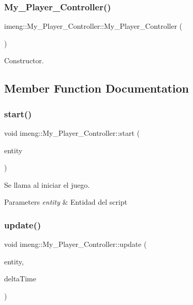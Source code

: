 \subsubsection{My\_Player\_Controller()}
{\footnotesize\ttfamily imeng\+::\+My\+\_\+\+Player\+\_\+\+Controller\+::\+My\+\_\+\+Player\+\_\+\+Controller (\begin{DoxyParamCaption}{ }\end{DoxyParamCaption})}



Constructor. 



\subsection{Member Function Documentation}
\mbox{\label{classimeng_1_1_my___player___controller_a0e5ab00dc99d921e5464e4a69be9be8c}} 
\subsubsection{start()}
{\footnotesize\ttfamily void imeng\+::\+My\+\_\+\+Player\+\_\+\+Controller\+::start (\begin{DoxyParamCaption}\item[{Entity $\ast$}]{entity }\end{DoxyParamCaption})\hspace{0.3cm}{\ttfamily [override]}}



Se llama al iniciar el juego. 


\begin{DoxyParams}{Parameters}
{\em entity} & Entidad del script \\
\hline
\end{DoxyParams}
\mbox{\label{classimeng_1_1_my___player___controller_a04ed366cb26b07aee77c0ec467eba849}} 
\subsubsection{update()}
{\footnotesize\ttfamily void imeng\+::\+My\+\_\+\+Player\+\_\+\+Controller\+::update (\begin{DoxyParamCaption}\item[{Entity $\ast$}]{entity,  }\item[{float}]{delta\+Time }\end{DoxyParamCaption})\hspace{0.3cm}{\ttfamily [override]}}



